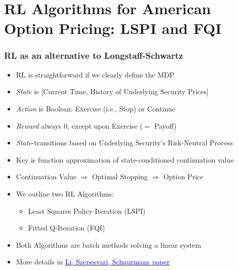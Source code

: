\documentclass[handout]{beamer}
\begin{document}
\section{RL Algorithms for American Option Pricing: LSPI and FQI}

\begin{frame}
\frametitle{RL as an alternative to Longstaff-Schwartz}
\pause
\begin{itemize}[<+->]
\item RL is straightforward if we clearly define the MDP
\item {\em State} is [Current Time, History of Underlying Security Prices]
\item {\em Action} is Boolean: Exercise (i.e., Stop) or Continue
\item {\em Reward} always 0, except upon Exercise ($=$ Payoff)
\item {\em State}-transitions based on Underlying Security's Risk-Neutral Process
\item Key is function approximation of state-conditioned continuation value
\item Continuation Value $\Rightarrow$ Optimal Stopping $\Rightarrow$ Option Price
\item We outline two RL Algorithms:
\begin{itemize}
\item Least Squares Policy Iteration (LSPI)
\item Fitted Q-Iteration (FQI)
\end{itemize}
\item Both Algorithms are batch methods solving a linear system
\item More details in \href{http://proceedings.mlr.press/v5/li09d/li09d.pdf}{\underline{\textcolor{blue}{Li, Szepesvari, Schuurmans paper}}}
\end{itemize}
\end{frame}
\end{document}
